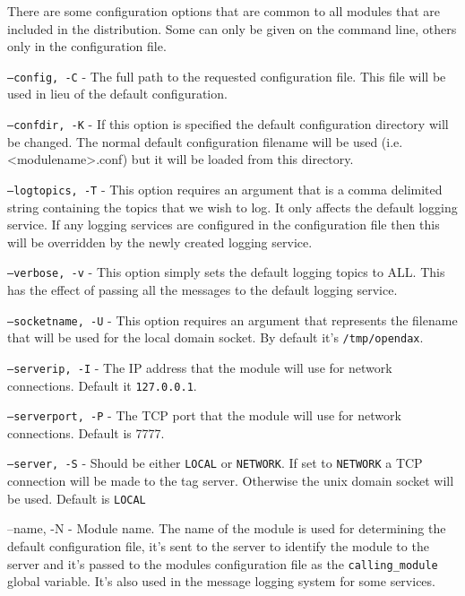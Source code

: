 	There are some configuration options that are common to all modules that are
	included in the distribution.  Some can only be given on the command line,
	others only in the configuration file.
	
	\begin{list}{}{Command Line Options}
		\item[\texttt{--config, -C}] - The full path to the requested configuration
		file.  This file will be used in lieu of the default configuration.
		\item[\texttt{--confdir, -K}] - If this option is specified the default
		configuration directory will be changed.  The normal default configuration
		filename will be used (i.e. <modulename>.conf) but it will be loaded from this
		directory.
		\item[\texttt{--logtopics, -T}] - This option requires an argument that is a
		comma delimited string containing the topics that we wish to log.  It only
		affects the default logging service.  If any logging services are configured in
		the configuration file then this will be overridden by the newly created logging
		service.
		\item[\texttt{--verbose, -v}] - This option simply sets the default logging
		topics to ALL.  This has the effect of passing all the messages to the default
		logging service.
		\item[\texttt{--socketname, -U}] - This option requires an argument that
		represents the filename that will be used for the local domain socket.  By
		default it's \texttt{/tmp/opendax}.
		\item[\texttt{--serverip, -I}] - The IP address that the module will use for
		network connections.  Default it \texttt{127.0.0.1}.
		\item[\texttt{--serverport, -P}] - The TCP port that the module will use for
		network connections.  Default is 7777.
		\item[\texttt{--server, -S}] - Should be either \texttt{LOCAL} or
		\texttt{NETWORK}.  If set to \texttt{NETWORK} a TCP connection will be made to
		the tag server.  Otherwise the unix domain socket will be used.  Default is
		\texttt{LOCAL}
		\item[--name, -N] - Module name.  The name of the module is used for
		determining the default configuration file, it's sent to the server to identify
		the module to the server and it's passed to the modules configuration file as
		the \texttt{calling\_module} global variable.  It's also used in the message
		logging system for some services.

\end{list}
